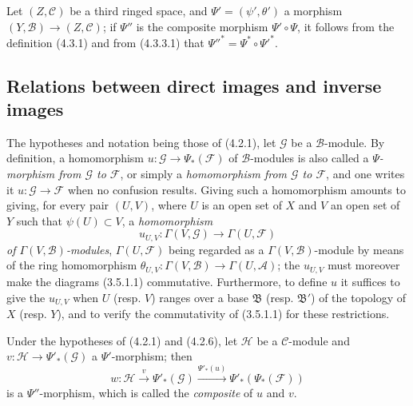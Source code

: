 \begin{env}[4.3.6]
\label{0.4.3.6}
Let $(Z,\mathcal{C})$ be a third ringed space, and
$\Psi'=(\psi',\theta')$ a morphism $(Y,\mathcal{B})\to(Z,\mathcal{C})$;
if $\Psi''$ is the composite morphism $\Psi'\circ\Psi$, it follows from the
definition (4.3.1) and from (4.3.3.1) that
${\Psi''}^*=\Psi^*\circ{\Psi'}^*$.
\end{env}

\subsection{Relations between direct images and inverse images}
\label{subsection:0.4.4}

\begin{env}[4.4.1]
\label{0.4.4.1}
The hypotheses and notation being those of (4.2.1), let $\mathcal{G}$ be a
$\mathcal{B}$-module. By definition, a homomorphism
$u:\mathcal{G}\to\Psi_*(\mathcal{F})$ of $\mathcal{B}$-modules is
also called a \emph{$\Psi$-morphism from $\mathcal{G}$ to $\mathcal{F}$}, or
simply a \emph{homomorphism from $\mathcal{G}$ to $\mathcal{F}$}, and one
writes it $u:\mathcal{G}\to\mathcal{F}$ when no confusion results.
Giving such a homomorphism amounts to giving, for every pair $(U,V)$,
where $U$ is an open set of $X$ and $V$ an open set of $Y$ such that
$\psi(U)\subset V$, a \emph{homomorphism}
\[
  u_{U,V}:\Gamma(V,\mathcal{G})\longrightarrow\Gamma(U,\mathcal{F})
\]
\emph{of $\Gamma(V,\mathcal{B})$-modules}, $\Gamma(U,\mathcal{F})$ being
regarded as a $\Gamma(V,\mathcal{B})$-module by means of the ring
homomorphism
$\theta_{U,V}:\Gamma(V,\mathcal{B})\to\Gamma(U,\mathcal{A})$; the $u_{U,V}$
must moreover make the diagrams (3.5.1.1) commutative. Furthermore, to
define $u$ it suffices to give the $u_{U,V}$ when $U$ (resp.
$V$) ranges over a base $\mathfrak{B}$ (resp. $\mathfrak{B}'$) of the topology
of $X$ (resp. $Y$), and to verify the commutativity of (3.5.1.1) for these
restrictions.
\end{env}

\begin{env}[4.4.2]
\label{0.4.4.2}
Under the hypotheses of (4.2.1) and (4.2.6), let $\mathcal{H}$ be a
$\mathcal{C}$-module and $v:\mathcal{H}\to\Psi'_*(\mathcal{G})$ a
$\Psi'$-morphism; then
\[
  w:\mathcal{H}\xrightarrow{v}\Psi'_*(\mathcal{G})
  \xrightarrow{\Psi'_*(u)}\Psi'_*(\Psi_*(\mathcal{F}))
\]
is a $\Psi''$-morphism, which is called the \emph{composite} of $u$ and $v$.
\end{env}

